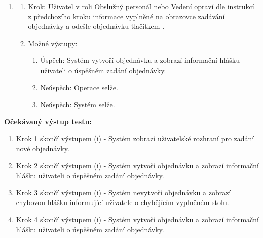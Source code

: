 \documentclass[a4paper,10pt]{article}
\begin{document}
\begin{enumerate}
	\item 
	\begin{enumerate}
		\item Krok: Uživatel v roli Obslužný personál nebo Vedení opraví dle instrukcí z předchozího kroku informace vyplněné na obrazovce zadávání objednávky a odešle objednávku tlačítkem .
		\item Možné výstupy:
		\begin{enumerate}
			\item Úspěch: Systém vytvoří objednávku a zobrazí informační hlášku uživateli o úspěšném zadání objednávky.
			\item Neúspěch: Operace selže.
			\item Neúspěch: Systém selže.
		\end{enumerate} 
	\end{enumerate}
\end{enumerate}

\textbf{Očekávaný výstup testu:} \\
\begin{enumerate}
	\item Krok 1 skončí výstupem (i) - Systém zobrazí uživatelské rozhraní pro zadání nové objednávky.
	\item Krok 2 skončí výstupem (i) - Systém vytvoří objednávku a zobrazí informační hlášku uživateli o úspěšném zadání objednávky.
	\item Krok 3 skončí výstupem (i) - Systém nevytvoří objednávku a zobrazí chybovou hlášku informující uživatele o chybějícím vyplněném stolu.
	\item Krok 4 skončí výstupem (i) - Systém vytvoří objednávku a zobrazí informační hlášku uživateli o úspěšném zadání objednávky.
\end{enumerate}
\end{document}
